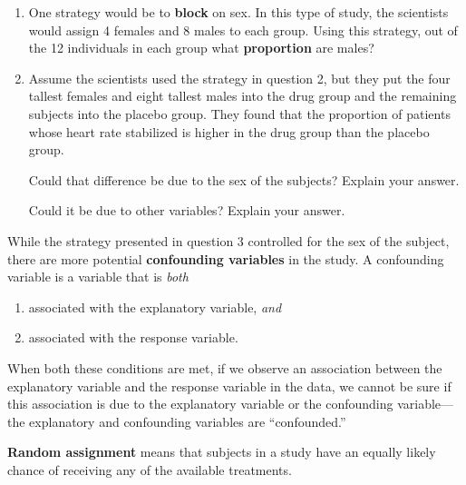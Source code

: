 \documentclass[
]{report}
\providecommand{\tightlist}{%
  \setlength{\itemsep}{0pt}\setlength{\parskip}{0pt}}
\begin{document}
\vspace{1.5in}

\begin{enumerate}
\def\labelenumi{\arabic{enumi}.}
\setcounter{enumi}{1}
\item
  One strategy would be to \textbf{block} on sex. In this type of study, the scientists would assign 4 females and 8 males to each group. Using this strategy, out of the 12 individuals in each group what \textbf{proportion} are males?
  \vspace{0.3in}
\item
  Assume the scientists used the strategy in question 2, but they put the four tallest females and eight tallest males into the drug group and the remaining subjects into the placebo group. They found that the proportion of patients whose heart rate stabilized is higher in the drug group than the placebo group.\\
  \vspace{0.1in}

  Could that difference be due to the sex of the subjects? Explain your answer.
  \vspace{0.5in}

  Could it be due to other variables? Explain your answer.
  \vspace{0.5in}
\end{enumerate}

While the strategy presented in question 3 controlled for the sex of the subject, there are more potential \textbf{confounding variables} in the study. A confounding variable is a variable that is \emph{both}

\begin{enumerate}
\def\labelenumi{\arabic{enumi}.}
\tightlist
\item
  associated with the explanatory variable, \emph{and}
\item
  associated with the response variable.
\end{enumerate}

When both these conditions are met, if we observe an association between the explanatory variable and the response variable in the data, we cannot be sure if this association is due to the explanatory variable or the confounding variable---the explanatory and confounding variables are ``confounded.''

\textbf{Random assignment} means that subjects in a study have an equally likely chance of receiving any of the available treatments.

\newpage
\end{document}
